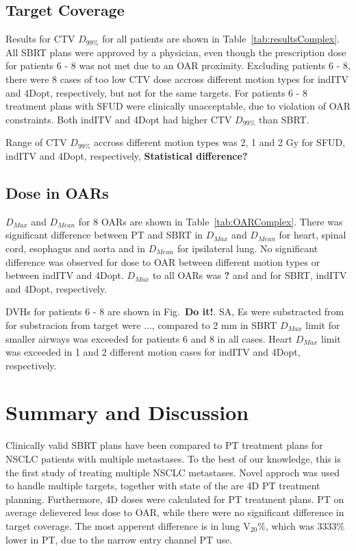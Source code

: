 \documentclass[type=dr, dr=rernat, accentcolor=tud7b,colorbacktitle, bigchapter, openright, twoside, 12pt ]{tudthesis}
\begin{document}
\subsection{Target Coverage}

Results for CTV $D_{99\%}$ for all patients are shown in Table~\ref{tab:resultsComplex}. All SBRT plans were approved by a physician, 
even though the prescription dose for patients 6 - 8 was not met due to an OAR proximity. Excluding patients 6 - 8, there were 8  cases of too low CTV dose accross different
motion types for indITV and 4Dopt, respectively, but not for the same targets.
For patients 6 - 8 treatment plans with SFUD were clinically unacceptable, due to violation of OAR constraints. Both indITV and 4Dopt had higher CTV $D_{99\%}$ than SBRT.

Range of CTV $D_{99\%}$ accross different motion types was 2, 1 and 2 Gy for SFUD, indITV and 4Dopt, respectively, \textbf{Statistical difference?}



\subsection{Dose in OARs}

$D_{Max}$ and $D_{Mean}$ for 8 OARs are shown in Table~\ref{tab:OARComplex}. There was significant difference between PT and SBRT in $D_{Max}$ and $D_{Mean}$ for heart, spinal cord, esophagus and aorta and in $D_{Mean}$ for ipsilateral lung.
No significant difference was observed for dose to OAR between different motion types or between indITV and 4Dopt. $D_{Max}$ to all OARs was \textbf{?} and and for SBRT, indITV and 4Dopt, respectively.

DVHs for patients 6 - 8 are shown in Fig.~\textbf{Do it!}. SA, Es were substracted from for substracion from target were ..., compared to 2 mm in SBRT
$D_{Max}$ limit for smaller airways was exceeded for patients 6 and 8 in all cases. Heart $D_{Max}$ limit was exceeded in 1 and 2 different motion cases for indITV and 4Dopt, respectively.





\section{Summary and Discussion}

Clinically valid SBRT plans have been compared to PT treatment plans for NSCLC patients with multiple metastases. To the best of our knowledge, this is the first study of treating multiple NSCLC metastases. Novel approch was used to handle multiple targets, together
with state of the are 4D PT treatment planning. Furthermore, 4D doses were calculated for PT treatment plans. PT on average delievered less dose to OAR, while there were no
significant difference in target coverage. The most apperent difference is in lung V${_20\%}$, which was 3333\% lower in PT, due to the narrow entry channel PT use.
\end{document}
